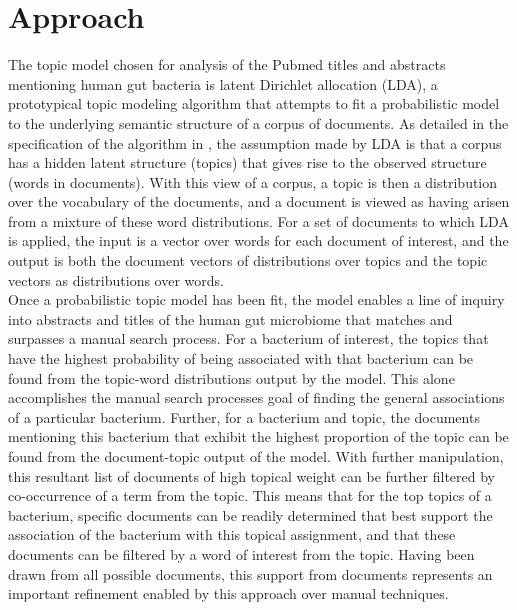\documentclass{bioinfo}
\begin{document}
\section{Approach}
\indent The topic model chosen for analysis of the Pubmed titles and abstracts mentioning human gut bacteria is latent Dirichlet allocation (LDA), a prototypical topic modeling algorithm that attempts to fit a probabilistic model to the underlying semantic structure of a corpus of documents. As detailed in the specification of the algorithm in \citealp{Blei03}, the assumption made by LDA is that a corpus has a hidden latent structure (topics) that gives rise to the observed structure (words in documents). With this view of a corpus, a topic is then a distribution over the vocabulary of the documents, and a document is viewed as having arisen from a mixture of these word distributions. For a set of documents to which LDA is applied, the input is a vector over words for each document of interest, and the output is both the document vectors of distributions over topics and the topic vectors as distributions over words.\\
\indent Once a probabilistic topic model has been fit, the model enables a line of inquiry into abstracts and titles of the human gut microbiome that matches and surpasses a manual search process. For a bacterium of interest, the topics that have the highest probability of being associated with that bacterium can be found from the topic-word distributions output by the model. This alone accomplishes the manual search processes goal of finding the general associations of a particular bacterium. Further, for a bacterium and topic, the documents mentioning this bacterium that exhibit the highest proportion of the topic can be found from the document-topic output of the model. With further manipulation, this resultant list of documents of high topical weight can be further filtered by co-occurrence of a term from the topic. This means that for the top topics of a bacterium, specific documents can be readily determined that best support the association of the bacterium with this topical assignment, and that these documents can be filtered by a word of interest from the topic. Having been drawn from all possible documents, this support from documents represents an important refinement enabled by this approach over manual techniques. \\
\end{document}
